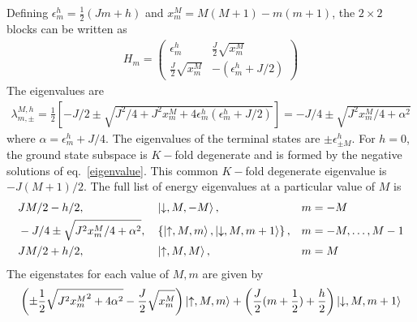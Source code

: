 \documentclass{revtex4-2}
\numberwithin{equation}{section}
\begin{document}
Defining \(\epsilon^h_m = \frac{1}{2}\left(Jm + h\right) \) and \(x^M_m = M(M+1) - m(m+1)\), the \(2\times 2\) blocks can be written as
\begin{equation}\begin{aligned}
	H_m = \begin{pmatrix} \epsilon^h_m & \frac{J}{2}\sqrt{x^M_m} \\ \frac{J}{2}\sqrt{x^M_m} & -\left( \epsilon^h_m + J/2 \right)   \end{pmatrix} 
\end{aligned}\end{equation}
The eigenvalues are 
\begin{equation}\begin{aligned}
	\label{eigenvalue}
	\lambda_{m, \pm}^{M, h} = \frac{1}{2}\left[-J/2 \pm \sqrt{J^2/4 + J^2 x_m^M + 4\epsilon^h_m\left(\epsilon^h_m + J/2\right) }\right] = -J/4 \pm \sqrt{J^2x^M_m/4 + \alpha^2}
\end{aligned}\end{equation}
where \(\alpha = \epsilon^h_m + J/4\).
The eigenvalues of the terminal states are \(\pm\epsilon^h_{\pm M}\). For \(h = 0\), the ground state subspace is \(K-\)fold degenerate and is formed by the negative solutions of eq.~\ref{eigenvalue}. This common \(K-\)fold degenerate eigenvalue is \(-J(M+1)/2\).
The full list of energy eigenvalues at a particular value of \(M\) is
\begin{equation}\begin{aligned}
\label{stargraph_spectrum}
&		JM/2 - h/2, &&\ket{\downarrow, M, -M}, && m = -M\\
&-J/4 \pm \sqrt{J^2x^M_m/4 + \alpha^2}, &&\left\{\ket{\uparrow, M, m}, \ket{\downarrow, M, m+1}\right\}, &&m=-M,\ldots,M-1\\
&JM/2 + h/2, &&\ket{\uparrow, M, M},&& m = M\\
\end{aligned}\end{equation}
The eigenstates for each value of \(M,m\) are given by
\begin{equation}\begin{aligned}
	\left(\pm\frac{1}{2}\sqrt{J^2 {x_m^M}^2 + 4\alpha^2} - \frac{J}{2}\sqrt{x_m^M}\right)\ket{\uparrow, M, m} + \left(\frac{J}{2}(m+\frac{1}{2}) + \frac{h}{2}\right) \ket{\downarrow, M, m+1}
\end{aligned}\end{equation}
\end{document}
